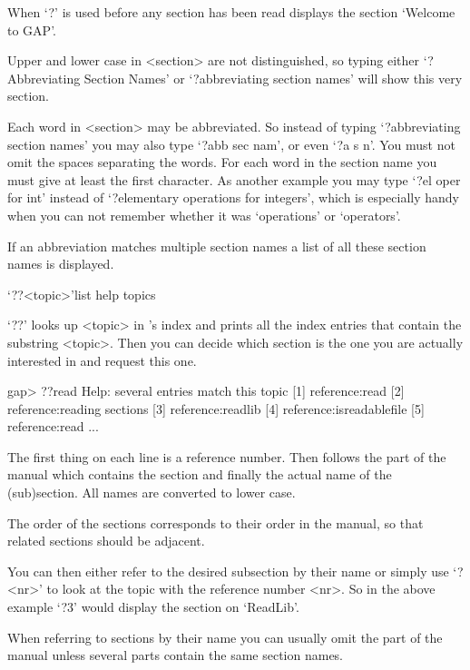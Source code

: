 When `?' is used before any section has been read {\GAP} displays the
section `Welcome to GAP'.


Upper and lower case in <section> are not distinguished, so typing either
`?Abbreviating Section Names' or `?abbreviating section names' will show
this very section.

Each word in <section> may be abbreviated. So instead of typing
`?abbreviating section names' you may also type `?abb sec nam', or even `?a
s n'. You must not omit the spaces separating the words. For each word in
the section name you must give at least the first character. As another
example you may type `?el oper for int' instead of `?elementary operations
for integers', which is especially handy when you can not remember whether
it was `operations' or `operators'.

If an abbreviation matches multiple section names a list of all these
section names is displayed.


\>`??<topic>'{list help topics}

`??' looks up <topic> in {\GAP}'s index and prints all the index entries
that contain the substring <topic>. Then you can decide which section is
the one you are actually interested in and request this one.

\begintt
gap> ??read
Help: several entries match this topic
[1] reference:read
[2] reference:reading sections
[3] reference:readlib
[4] reference:isreadablefile
[5] reference:read
...
\endtt

The first thing on each line is a reference number.
Then follows the part of the manual which contains the section and
finally the actual name of the (sub)section. All names are converted to
lower case.

The order of the sections corresponds to their order in the
{\GAP} manual, so that related sections should be adjacent.

You can then either refer to the desired subsection by their name or simply
use `?<nr>' to look at the topic with the reference number <nr>. So in the
above example `?3' would display the section on `ReadLib'.

When referring to sections by their name you can usually omit the part
of the manual unless several parts contain the same section names.

